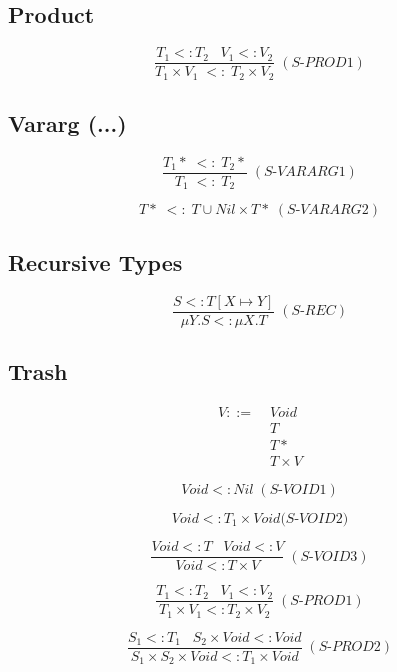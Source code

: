 \documentclass[12pt]{article}
\begin{document}
\subsection{Product}

\[
\frac{T_{1} <: T_{2} \;\;\; V_{1} <: V_{2}}
     {T_{1} \times V_{1} \; <: \; T_{2} \times V_{2}} \; (\textit{S-PROD1})
\]

\subsection{Vararg (...)}

\[
\frac{T_{1}* \; <: \; T_{2}*}
     {T_{1} \; <: \; T_{2}} \; (\textit{S-VARARG1})
\]

\[
T* \; <: \; T \cup Nil \times {T*} \; (\textit{S-VARARG2})
\]

\subsection{Recursive Types}

\[
\frac{S <: T[X \mapsto Y]}
     {\mu Y.S <: \mu X.T} \; (\textit{S-REC})
\]

\subsection{Trash}

\begin{align*}
V ::= \; & Void\\
& T\\
& T*\\
& T \times V
\end{align*}

\[
Void <: Nil \; (\textit{S-VOID1})
\]

\[
Void <: T_{1} \times Void (\textit{S-VOID2)}
\]

\[
\frac{Void <: T \;\;\; Void <: V}
     {Void <: T \times V} \; (\textit{S-VOID3})
\]

\[
\frac{T_{1} <: T_{2} \;\;\; V_{1} <: V_{2}}
     {T_{1} \times V_{1} <: T_{2} \times V_{2}} \; (\textit{S-PROD1})
\]

\[
\frac{S_{1} <: T_{1} \;\;\; S_{2} \times Void <: Void}
     {S_{1} \times S_{2} \times Void <: T_{1} \times Void} \; (\textit{S-PROD2})
\]
\end{document}
